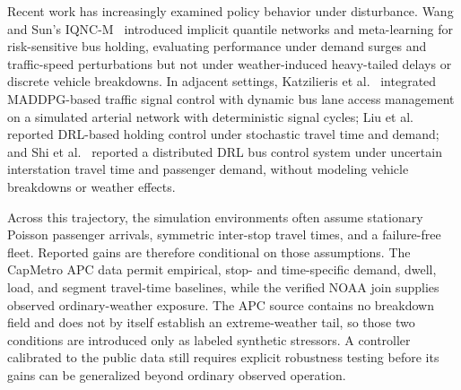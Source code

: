 Recent work has increasingly examined policy behavior under disturbance. Wang and Sun's IQNC-M~\cite{Wangsun} introduced implicit quantile networks and meta-learning for risk-sensitive bus holding, evaluating performance under demand surges and traffic-speed perturbations but not under weather-induced heavy-tailed delays or discrete vehicle breakdowns. In adjacent settings, Katzilieris et al.~\cite{Katzilieris2026MARL} integrated MADDPG-based traffic signal control with dynamic bus lane access management on a simulated arterial network with deterministic signal cycles; Liu et al.~\cite{Liu2023DRLHolding} reported DRL-based holding control under stochastic travel time and demand; and Shi et al.~\cite{Shi2022DistDRL} reported a distributed DRL bus control system under uncertain interstation travel time and passenger demand, without modeling vehicle breakdowns or weather effects.

Across this trajectory, the simulation environments often assume stationary Poisson passenger arrivals, symmetric inter-stop travel times, and a failure-free fleet. Reported gains are therefore conditional on those assumptions. The CapMetro APC data permit empirical, stop- and time-specific demand, dwell, load, and segment travel-time baselines, while the verified NOAA join supplies observed ordinary-weather exposure. The APC source contains no breakdown field and does not by itself establish an extreme-weather tail, so those two conditions are introduced only as labeled synthetic stressors. A controller calibrated to the public data still requires explicit robustness testing before its gains can be generalized beyond ordinary observed operation.

